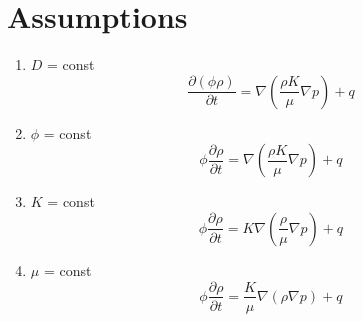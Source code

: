 \documentclass{article}
\begin{document}
\section{Assumptions}
\begin{enumerate}
\item $D$ = const
\begin{equation}
\frac{\partial (\phi \rho)}{\partial t} = \nabla \left(\frac{\rho K}{\mu}
\nabla p \right) + q
\end{equation}
\item $\phi$ = const
\begin{equation}
\phi \frac{\partial \rho}{\partial t} = \nabla \left(\frac{\rho K}{\mu}
\nabla p \right) + q
\end{equation}
\item $K$ = const
\begin{equation}
\phi \frac{\partial \rho}{\partial t} = K \nabla \left(\frac{\rho}{\mu} \nabla
p \right) + q
\end{equation}
\item $\mu$ = const
\begin{equation}
\phi \frac{\partial \rho}{\partial t} = \frac{K}{\mu} \nabla (\rho \nabla p) +
q
\end{equation}


\end{enumerate}
\end{document}

